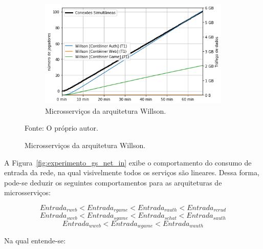 \begin{figure}[htb!]
    \begin{subfigure}{0.5\textwidth}
        \centering
        \includegraphics[width=.95\linewidth]{figuras/analise/rt/w_net_in_arch.png}
        \caption{Microsserviços da arquitetura Willson.}
        \label{fig:w_netin_gs}
    \end{subfigure}

    Fonte: O próprio autor.
\end{figure}

A Figura~\ref{fig:experimento_gs_net_in} exibe o comportamento do consumo de entrada da rede, na qual visivelmente todos os serviços são lineares.
%
Dessa forma, pode-se deduzir os seguintes comportamentos para as arquiteturas de microsserviços:

$$
     Entrada_{rweb} < Entrada_{rgame} < Entrada_{rauth} < Entrada_{rcrud}
$$
$$
     Entrada_{sweb} < Entrada_{sgame} < Entrada_{schat} < Entrada_{sauth}
$$
$$
     Entrada_{wweb} < Entrada_{wgame} < Entrada_{wauth}
$$

Na qual entende-se:

